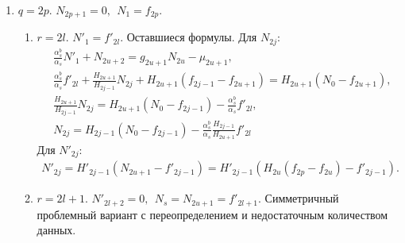 \begin{enumerate}
    \begin{enumerate}
        \item \(q=2p\). \(N_{2p+1} = 0, ~~ N_1 = f_{2p}\).
        \begin{enumerate}
            \item \(r=2l\). \(N'_1 = f'_{2l}\). Оставшиеся формулы. Для \(N_{2j}\):
            \begin{equation*}
                \begin{split}
                    & \frac{\alpha^b_s}{\alpha_s} N'_1 + N_{2u+2} = g_{2u+1} N_{2u} - \mu_{2u+1}, \\
                    & \frac{\alpha^b_s}{\alpha_s} f'_{2l} + \frac{H_{2u+1}}{H_{2j-1}} N_{2j} + H_{2u+1} (f_{2j-1} - f_{2u+1}) = H_{2u+1} (N_0 - f_{2u+1}), \\
                    & \frac{H_{2u+1}}{H_{2j-1}} N_{2j} = H_{2u+1} (N_0 - f_{2j-1}) - \frac{\alpha^b_s}{\alpha_s} f'_{2l}, \\
                    & N_{2j} = H_{2j-1} (N_0 - f_{2j-1}) - \frac{\alpha^b_s}{\alpha_s} \frac{H_{2j-1}}{H_{2u+1}} f'_{2l}
                \end{split}
            \end{equation*}
            Для \(N'_{2j}\):
            \begin{equation*}
                \begin{split}
                    N'_{2j} = H'_{2j-1} (N_{2u+1} - f'_{2j-1}) = H'_{2j-1} ( H_{2u} (f_{2p} - f_{2u}) - f'_{2j-1}).
                \end{split}
            \end{equation*}

            \item \(r=2l+1\). \(N'_{2l+2} = 0, ~~ N_s = N_{2u+1} = f'_{2l+1} \). 
            Симметричный проблемный вариант с переопределением и недостаточным количеством данных. %
        \end{enumerate} %


\end{enumerate}
\end{enumerate}
